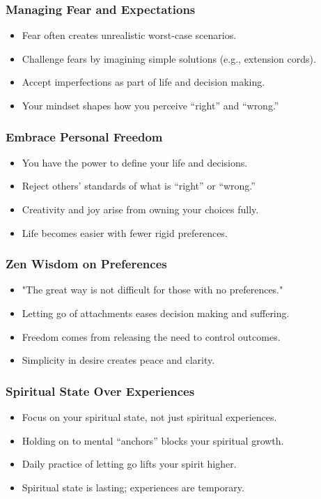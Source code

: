 \begin{frame}[fragile]\frametitle{Managing Fear and Expectations}
  \begin{itemize}
    \item Fear often creates unrealistic worst-case scenarios.
    \item Challenge fears by imagining simple solutions (e.g., extension cords).
    \item Accept imperfections as part of life and decision making.
    \item Your mindset shapes how you perceive “right” and “wrong.”
  \end{itemize}
\end{frame}

\begin{frame}[fragile]\frametitle{Embrace Personal Freedom}
  \begin{itemize}
    \item You have the power to define your life and decisions.
    \item Reject others’ standards of what is “right” or “wrong.”
    \item Creativity and joy arise from owning your choices fully.
    \item Life becomes easier with fewer rigid preferences.
  \end{itemize}
\end{frame}

\begin{frame}[fragile]\frametitle{Zen Wisdom on Preferences}
  \begin{itemize}
    \item "The great way is not difficult for those with no preferences."
    \item Letting go of attachments eases decision making and suffering.
    \item Freedom comes from releasing the need to control outcomes.
    \item Simplicity in desire creates peace and clarity.
  \end{itemize}
\end{frame}

\begin{frame}[fragile]\frametitle{Spiritual State Over Experiences}
  \begin{itemize}
    \item Focus on your spiritual state, not just spiritual experiences.
    \item Holding on to mental “anchors” blocks your spiritual growth.
    \item Daily practice of letting go lifts your spirit higher.
    \item Spiritual state is lasting; experiences are temporary.
  \end{itemize}
\end{frame}

